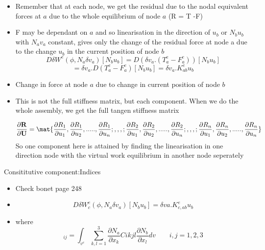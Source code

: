  
 	\begin{frame}
 		\begin{itemize}
 			\item Remember that at each node, we get the residual due to the nodal equivalent forces at $a$ due to the whole equilibrium of node $a$ (R = T -F)
 			\item F may be dependant on $a$ and so linearisation in the direction of $u_b$ or $N_bu_b$ with $N_av_a$ constant, gives only the change of the residual force at node a due to the change $u_b$ in the current position of node $b$
 			\begin{equation}
 			D\delta W^e(\phi,N_a\delta v_a)[N_bu_b] = D(\delta v_a.(T_a^e - F_a^e))[N_bu_b]
 			\end{equation}
 			\begin{equation}
 			 = \delta v_a.D(T_a^e - F_a^e)[N_bu_b] = \delta v_a.K^e_{ab}u_b
 			\end{equation}
 			\item Change in force at node $a$ due to change in current position of node $b$
 			\item This is not the full stiffness matrix, but each component. When we do the whole assembly, we get the full tangen stiffness matrix
 			
 			\begin{equation}
 				\frac{\partial \ve{R}}{\partial \ve{U}} = \mat{\frac{\partial R_1}{\partial u_1},\frac{\partial R_1}{\partial u_2},.....,\frac{\partial R_1}{\partial u_n};
 					 , , , ;
 				\frac{\partial R_2}{\partial u_1},\frac{\partial R_2}{\partial u_2},.....,\frac{\partial R_2}{\partial u_n};
 				 , , , ;
	 			\frac{\partial R_n}{\partial u_1},\frac{\partial R_n}{\partial u_2},.....,\frac{\partial R_n}{\partial u_n}}
 			\end{equation}
 			So one component here is attained by finding the linearisation in one direction node with the virtual work equilibrium in another node seperately
 		\end{itemize}
 	\end{frame}
 
 
 	\begin{frame}{Consititutive component:Indices}
 		\begin{itemize}
 			\item Check bonet page 248
 			\item 
 			\begin{equation}
 			D\delta W_c^e(\phi,N_a\delta v_a)[N_bu_b] = \delta va. K^e_{c,ab} u_b
 			\end{equation}
 			\item where
 			\begin{equation}
 			[K_{c,ab}]_{ij} = \int_{v^e} \sum_{k,l=1}^{3} \frac{\partial N_a}{\partial x_k} Cikjl \frac{\partial N_b}{\partial x_l} dv \qquad i,j = 1,2,3
 			\end{equation}
 		\end{itemize}
 	\end{frame}
 
